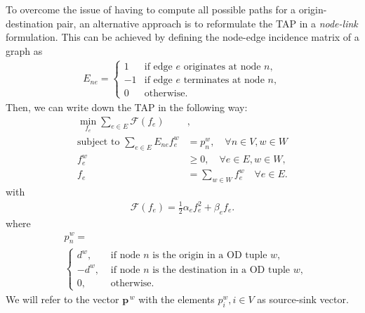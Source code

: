 \documentclass[twocolumn,english,groupedaddress, superscriptaddress,aps,pre,10pt,floatfix]{revtex4-2}
\renewcommand{\vec}[1]{{\boldsymbol{#1}}}
\begin{document}
To overcome the issue of having to compute all possible paths for a origin-destination pair, an alternative approach is to reformulate the TAP in a \textit{node-link} formulation. This can be achieved by defining the node-edge incidence matrix of a graph as 
\begin{align}\label{eq:app-edge-incidence}
    E_{ne} = 
    \begin{cases} 
    1 & \text{if edge } e \text{ originates at node } n, \\
    -1 & \text{if edge } e \text{ terminates at node } n, \\
    0 & \text{otherwise}.
    \end{cases}
\end{align}
Then, we can write down the TAP in the following way:
\begin{align}\label{eq:app-tap-node-link}
    \min_{{f_e}} \sum_{e \in E} \mathcal{F}(f_e) &, \nonumber \\
   \text{subject to } \sum_{e \in E} E_{ne}f^w_e &= p_n^w, \quad \forall n \in V, w \in W \nonumber \\
   f^w_e &\geq 0, \quad \forall e \in E, w \in W \nonumber,\\
   f_e &= \sum_{w\in W} f_e^w \quad \forall e \in E.
\end{align}
with 
\begin{align}
    \mathcal{F}(f_e) = \frac{1}{2}\alpha_e f_e^2 + \beta_e f_e.
\end{align}
where
\begin{equation}
    \begin{split}
    &p^w_n = \\
    &\begin{cases}
        d^w, & \text{ if node $n$ is the origin in a OD tuple $w$},\\
        -d^w, & \text{ if node $n$ is the destination in a OD tuple $w$},\\
        0, &\text{ otherwise}.
    \end{cases}   
\end{split}
\end{equation}
We will refer to the vector $\vec{p}^{\,w}$ with the elements $p^w_i, i \in V$ as source-sink vector.
\end{document}
